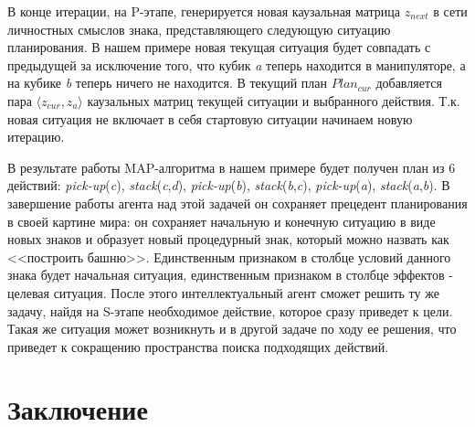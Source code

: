 \documentclass[12pt]{scrartcl}
\begin{document}
	В конце итерации, на P-этапе, генерируется новая каузальная матрица $z_{next}$ в сети личностных смыслов знака, представляющего следующую ситуацию планирования. В нашем примере новая текущая ситуация будет совпадать с предыдущей за исключение того, что кубик \textit{a} теперь находится в манипуляторе, а на кубике \textit{b} теперь ничего не находится. В текущий план $Plan_{cur}$ добавляется пара $\langle z_{cur}, z_a \rangle$ каузальных матриц текущей ситуации и выбранного действия. Т.к. новая ситуация не включает в себя стартовую ситуации начинаем новую итерацию.
	
	В результате работы MAP-алгоритма в нашем примере будет получен план из 6 действий: \textit{pick-up}(\textit{c}), \textit{stack}(\textit{c},\textit{d}), \textit{pick-up}(\textit{b}), \textit{stack}(\textit{b},\textit{c}), \textit{pick-up}(\textit{a}), \textit{stack}(\textit{a},\textit{b}). В завершение работы агента над этой задачей он сохраняет прецедент планирования в своей картине мира: он сохраняет начальную и конечную ситуацию в виде новых знаков и образует новый процедурный знак, который можно назвать как <<построить башню>>. Единственным признаком в столбце условий данного знака будет начальная ситуация, единственным признаком в столбце эффектов - целевая ситуация. После этого интеллектуальный агент сможет решить ту же задачу, найдя на S-этапе необходимое действие, которое сразу приведет к цели. Такая же ситуация может возникнуть и в другой задаче по ходу ее решения, что приведет к сокращению пространства поиска подходящих действий.
	
	\section*{Заключение}
	
\end{document}
